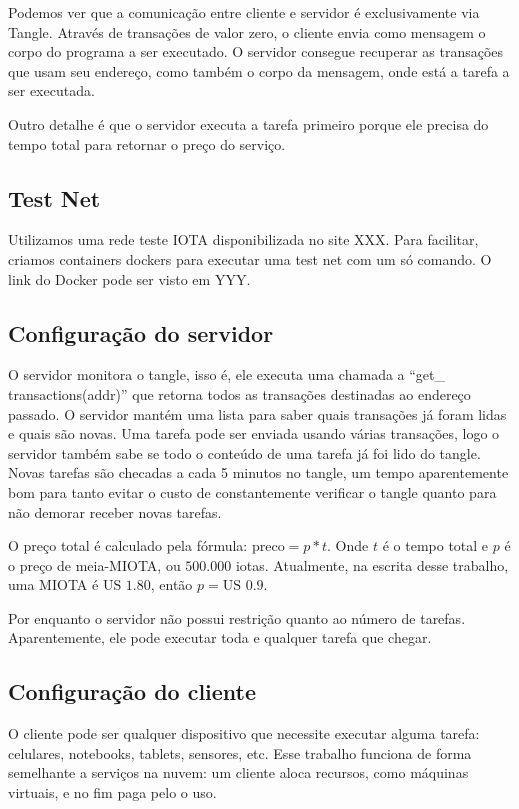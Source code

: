 \documentclass[a4paper]{article}
\begin{document}
Podemos ver que a comunicação entre cliente e servidor é exclusivamente via Tangle. Através de transações de valor zero, o cliente
envia como mensagem o corpo do programa a ser executado. O servidor consegue recuperar as transações que usam seu endereço, como
também o corpo da mensagem, onde está a tarefa a ser executada.

Outro detalhe é que o servidor executa a tarefa primeiro porque ele precisa do tempo total para retornar o preço do serviço.

\subsection{Test Net}

Utilizamos uma rede teste IOTA disponibilizada no site XXX. Para facilitar, criamos containers dockers para executar uma test
net com um só comando. O link do Docker pode ser visto em YYY.

\subsection{Configuração do servidor}

O servidor monitora o tangle, isso é, ele executa uma chamada a ``get\_ transactions(addr)'' que retorna todos as transações destinadas
ao endereço passado. O servidor mantém uma lista para saber quais transações já foram lidas e quais são novas. Uma tarefa pode ser enviada
usando várias transações, logo o servidor também sabe se todo o conteúdo de uma tarefa já foi lido do tangle. Novas tarefas são checadas a cada
5 minutos no tangle, um tempo aparentemente bom para tanto evitar o custo de constantemente verificar o tangle quanto para não demorar receber novas tarefas.

O preço total é calculado pela fórmula: $\text{preco} = p * t$. Onde $t$ é o tempo total e $p$ é o preço de meia-MIOTA, ou $500.000$ iotas.
Atualmente, na escrita desse trabalho, uma MIOTA é $\text{US }1.80$, então $p = \text{US }0.9$.

Por enquanto o servidor não possui restrição quanto ao número de tarefas. Aparentemente, ele pode executar toda e qualquer tarefa que chegar.

\subsection{Configuração do cliente}

O cliente pode ser qualquer dispositivo que necessite executar alguma tarefa: celulares, notebooks, tablets, sensores, etc.
Esse trabalho funciona de forma semelhante a serviços na nuvem: um cliente aloca recursos, como máquinas virtuais, e no fim
paga pelo o uso.
\end{document}
